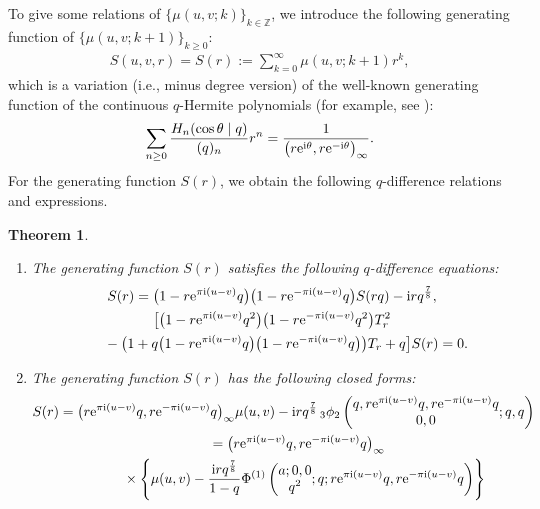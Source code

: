 \documentclass[pdftex]{sigma}
\numberwithin{equation}{section}
\newtheorem{thm}{Theorem}[section]
\theoremstyle{definition}
\begin{document}
To give some relations of $\{\mu(u,v;k)\}_{k \in \mathbb{Z}}$, we introduce the following generating function of $\{\mu(u,v;k+1)\}_{k\geq 0}$:
\begin{gather*}
S(u,v,r)=S(r):=\sum_{k=0}^{\infty }\mu(u,v;k+1)r^{k},
\end{gather*}
which is a variation (i.e., minus degree version) of the well-known generating function of the continuous $q$-Hermite polynomials (for example, see \cite[p.~542]{KLS}):
\begin{gather}
\label{eq:gen func of CqH}
\sum_{n\geq0}\frac{H_n(\cos\theta \mid q)}{(q)_n}r^n=\frac{1}{\big(r{\rm e}^{{\rm i}\theta},r{\rm e}^{-{\rm i}\theta}\big)_\infty}.
\end{gather}
For the generating function $S(r)$, we obtain the following $q$-difference relations and expressions.
\begin{thm}\label{thm:Sr}\quad
\begin{enumerate}\itemsep=0pt
\item[$(1)$] The generating function $S(r)$ satisfies the following $q$-difference equations:
\begin{gather}
\label{eq:Sr rec1}
S(r)
 =
 \big(1-r{\rm e}^{\pi{\rm i}(u-v)}q\big)\big(1-r{\rm e}^{-\pi{\rm i}(u-v)}q\big)S(rq)-{\rm i}rq^\frac{7}{8}, \\
 \big[\big(1-r{\rm e}^{\pi{\rm i}(u-v)}q^{2}\big)\big(1-r{\rm e}^{-\pi{\rm i}(u-v)}q^{2}\big)T_r^2 \nonumber \\
\label{eq:Sr rec2}
\qquad{} -
 \big(1+q\big(1-r{\rm e}^{\pi{\rm i}(u-v)}q\big)\big(1-r{\rm e}^{-\pi{\rm i}(u-v)}q\big)\big)T_r+q\big]S(r)=0.
\end{gather}
\item[$(2)$] The generating function $S(r)$ has the following closed forms:
\begin{gather}
S(r)
 =
 \big(r{\rm e}^{\pi{\rm i}(u-v)}q,r{\rm e}^{-\pi{\rm i}(u-v)}q\big)_{\infty }
 \mu(u,v)-{\rm i}rq^{\frac{7}{8}}\,
 {_{3}\phi _2}\left(\begin{matrix}q, r{\rm e}^{\pi{\rm i}(u-v)}q, r{\rm e}^{-\pi{\rm i}(u-v)}q \\ 0,0 \end{matrix};q,q\right) \nonumber\\
\hphantom{S(r)}{}
=
 \big(r{\rm e}^{\pi{\rm i}(u-v)}q,r{\rm e}^{-\pi{\rm i}(u-v)}q\big)_{\infty } \nonumber \\
\hphantom{S(r)=}{}
 \times \left\{\mu(u,v)-\frac{{\rm i}rq^{\frac{7}{8}}}{1-q}\Phi^{(1)}\left(\begin{matrix}a;0,0 \\ q^{2} \end{matrix};q;r{\rm e}^{\pi{\rm i}(u-v)}q, r{\rm e}^{-\pi{\rm i}(u-v)}q\right)\right\}\label{eq:Sr expression2} \\

\end{gather}
\end{enumerate}
\end{thm}
\end{document}
